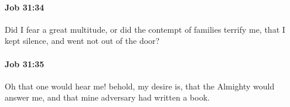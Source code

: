 		\paragraph{Job 31:34} %
			\label{JOB-31-34}

			Did I fear a great multitude, or did the contempt of families terrify me, that I kept silence, and went not out of the door?


		\paragraph{Job 31:35} %
			\label{JOB-31-35}

			Oh that one would hear me! behold, my desire is, that the Almighty would answer me, and that mine adversary had written a book.


